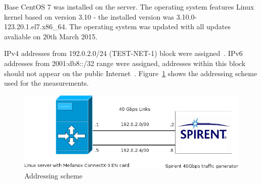 Base CentOS 7 was installed on the server.
The operating system features Linux kernel based on version 3.10 -
the installed version was 3.10.0-123.20.1.el7.x86\_64.
The operating system was updated with all updates avaliable on 20th March 2015.

IPv4 addresses from 192.0.2.0/24 (TEST-NET-1) block were assigned~\cite{rfc5737}.
IPv6 addresses from 2001:db8::/32 range were assigned,
addresses within this block should not appear on the public Internet~\cite{rfc3849}.
Figure~\ref{fig:addressing-scheme} shows the addressing scheme used for the measurements.
\begin{figure}[H]
	\centering
	\includegraphics[width=13.5cm,keepaspectratio]{fig/net-setup.png}
	\caption{Addressing scheme}
	\label{fig:addressing-scheme}
\end{figure}








